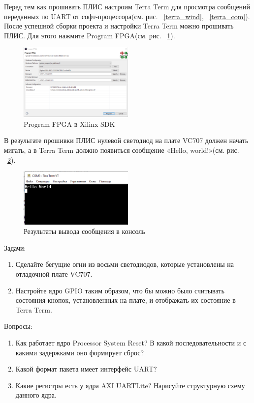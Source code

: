 \documentclass[a4paper,oneside ,10pt]{extreport}
\begin{document}
Перед тем как прошивать ПЛИС настроим Terra Term для просмотра сообщений переданных по UART от софт-процессора(см. рис. ~\ref{terra_wind}, ~\ref{terra_com}).
После успешной сборки проекта и настройки Terra Term можно прошивать ПЛИС. Для этого нажмите Program FPGA(см. рис. ~\ref{program_FPGA}).

\begin{figure}[!ht]
	\centering
	\includegraphics[width=0.5\textwidth]{image/program_FPGA.png}
	\caption{Program FPGA в Xilinx SDK}
	\label{program_FPGA}
\end{figure}

В результате прошивки ПЛИС нулевой светодиод на плате VC707 должен начать мигать, а в Terra Term должно появиться сообщение «Hello, world!»(см. рис. ~\ref{terra_result}).

\begin{figure}[!ht]
	\centering
	\includegraphics[width=0.5\textwidth]{image/terra_result.png}
	\caption{Результаты вывода сообщения в консоль}
	\label{terra_result}
\end{figure}

\newpage

Задачи:

\begin{enumerate}
	\item Сделайте бегущие огни из восьми светодиодов, которые установлены на отладочной плате VC707.
	\item Настройте ядро GPIO таким образом, что бы можно было считывать состояния кнопок, установленных на плате, и отображать их состояние в Terra Term.
\end{enumerate}

Вопросы:

\begin{enumerate}
	\item Как работает ядро Processor System Reset? В какой последовательности и с какими задержками оно формирует сброс?
	\item Какой формат пакета имеет интерфейс UART?
	\item Какие регистры есть у ядра AXI UARTLite? Нарисуйте структурную схему данного ядра.
\end{enumerate}
\end{document}
